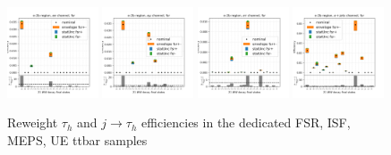 \begin{figure}
    \includegraphics[width=0.24\textwidth]{appendices/ttSystReweighting/figures/afterCorr/icata3_ch0_fsr.png}
    \includegraphics[width=0.24\textwidth]{appendices/ttSystReweighting/figures/afterCorr/icata3_ch1_fsr.png}
    \includegraphics[width=0.24\textwidth]{appendices/ttSystReweighting/figures/afterCorr/icata3_ch2_fsr.png}
    \includegraphics[width=0.24\textwidth]{appendices/ttSystReweighting/figures/afterCorr/icata3_ch3_fsr.png}
    
    \caption{Reweight $\tau_h$ and $j \to \tau_h$ efficiencies in the dedicated FSR, ISF, MEPS, UE ttbar samples}
    \label{fig:appendix:reweighttt:effAfterCorrFSR}
\end{figure}



